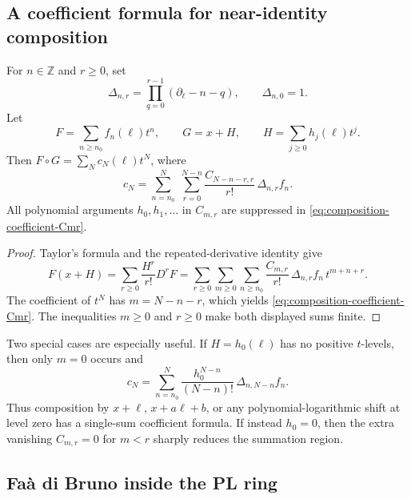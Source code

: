 \documentclass[11pt,oneside]{article}
\numberwithin{equation}{section}
\theoremstyle{definition}
\newcommand{\Z}{\mathbb Z}
\begin{document}
\subsection{A coefficient formula for near-identity composition}

For \(n\in\Z\) and \(r\ge0\), set
\begin{equation}\label{eq:Delta-nr-app}
  \Delta_{n,r}
  =\prod_{q=0}^{r-1}(\partial_\ell-n-q),
  \qquad \Delta_{n,0}=1.
\end{equation}
Let
\[
  F=\sum_{n\ge n_0}f_n(\ell)t^n,
  \qquad G=x+H,
  \qquad H=\sum_{j\ge0}h_j(\ell)t^j.
\]
Then \(F\circ G=\sum_N c_N(\ell)t^N\), where
\begin{equation}\label{eq:composition-coefficient-Cmr}
\boxed{
  c_N=
  \sum_{n=n_0}^{N}\;
  \sum_{r=0}^{N-n}
    \frac{C_{N-n-r,r}}{r!}\,
    \Delta_{n,r}f_n.
}
\end{equation}
All polynomial arguments \(h_0,h_1,\ldots\) in \(C_{m,r}\) are suppressed in
\eqref{eq:composition-coefficient-Cmr}.

\begin{proof}
Taylor's formula and the repeated-derivative identity give
\[
  F(x+H)
  =\sum_{r\ge0}\frac{H^r}{r!}D^rF
  =\sum_{r\ge0}\sum_{m\ge0}\sum_{n\ge n_0}
     \frac{C_{m,r}}{r!}\,
     \Delta_{n,r}f_n\,t^{m+n+r}.
\]
The coefficient of \(t^N\) has \(m=N-n-r\), which yields
\eqref{eq:composition-coefficient-Cmr}.  The inequalities \(m\ge0\) and
\(r\ge0\) make both displayed sums finite.
\end{proof}

Two special cases are especially useful.  If \(H=h_0(\ell)\) has no positive
\(t\)-levels, then only \(m=0\) occurs and
\begin{equation}\label{eq:composition-pure-log-shift}
  c_N=\sum_{n=n_0}^{N}
    \frac{h_0^{N-n}}{(N-n)!}\,
    \Delta_{n,N-n}f_n.
\end{equation}
Thus composition by \(x+\ell\), \(x+a\ell+b\), or any polynomial-logarithmic
shift at level zero has a single-sum coefficient formula.  If instead
\(h_0=0\), then the extra vanishing \(C_{m,r}=0\) for \(m<r\) sharply reduces
the summation region.

\subsection{Fa\`a di Bruno inside the PL ring}
\end{document}
